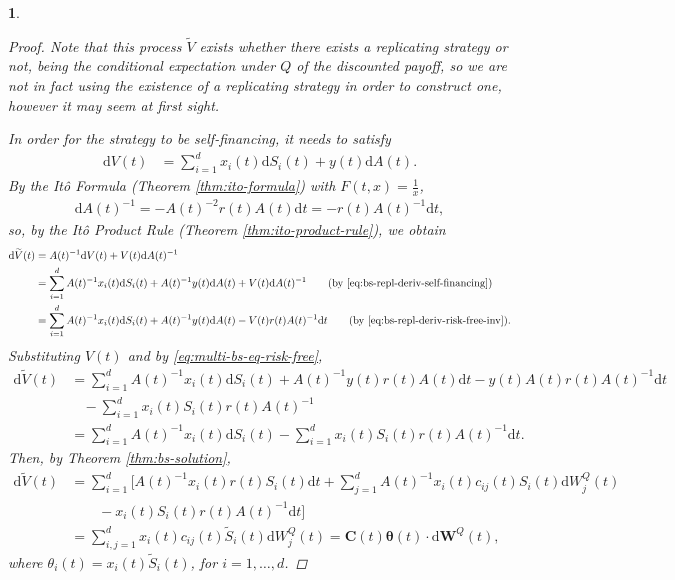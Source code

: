 \documentclass[english]{article}
\numberwithin{equation}{section}
\numberwithin{figure}{section}
\theoremstyle{bolddescit}
\newtheorem{theorem}{\protect\theoremname}[section]
\theoremstyle{definition}
\theoremstyle{definition}
\theoremstyle{plain}
\theoremstyle{plain}
\theoremstyle{bolddesc}
\theoremstyle{plain}
\theoremstyle{remark}
\providecommand{\theoremname}{Theorem}
\begin{document}
\begin{theorem}
\begin{proof}
    Note that this process $\widetilde{V}$ exists whether there exists a replicating strategy or not, being the conditional expectation under $Q$ of the discounted payoff, so we are not in fact using the existence of a replicating strategy in order to construct one, however it may seem at first sight.

    In order for the strategy to be self-financing, it needs to satisfy
    \begin{align}\label{eq:bs-repl-deriv-self-financing}
      \mathrm{d}V(t) &= \sum_{i=1}^d x_i(t) \mathrm{d}S_i(t) + y(t) \mathrm{d}A(t).
    \end{align}
    By the It\^o Formula (Theorem \ref{thm:ito-formula}) with $F(t,x) = \frac{1}{x}$,
    \begin{align}\label{eq:bs-repl-deriv-risk-free-inv}
      \mathrm{d}A(t)^{-1} = -A(t)^{-2} r(t) A(t) \mathrm{d}t = - r(t) A(t)^{-1} \mathrm{d}t,
    \end{align}
    so, by the It\^o Product Rule (Theorem \ref{thm:ito-product-rule}), we obtain
    \begin{align*}
      \mathrm{d}\widetilde{V}(t)
      &= A(t)^{-1} \mathrm{d}V(t) + V(t) \mathrm{d}A(t)^{-1}\\
      &= \sum_{i=1}^d A(t)^{-1} x_i(t) \mathrm{d}S_i(t) + A(t)^{-1} y(t) \mathrm{d}A(t) + V(t) \mathrm{d}A(t)^{-1}\tag{by \eqref{eq:bs-repl-deriv-self-financing}}\\
      &= \sum_{i=1}^d A(t)^{-1} x_i(t) \mathrm{d}S_i(t) + A(t)^{-1} y(t) \mathrm{d}A(t) - V(t) r(t) A(t)^{-1} \mathrm{d}t \tag{by \eqref{eq:bs-repl-deriv-risk-free-inv}}.
    \end{align*}
    Substituting $V(t)$ and by \eqref{eq:multi-bs-eq-risk-free},
    \begin{align*}
      \mathrm{d}\widetilde{V}(t)
      &= \sum_{i=1}^d A(t)^{-1} x_i(t) \mathrm{d}S_i(t) + A(t)^{-1} y(t) r(t) A(t) \mathrm{d}t - y(t) A(t) r(t) A(t)^{-1} \mathrm{d}t\\
        &\ \ \ \ - \sum_{i=1}^d x_i(t) S_i(t) r(t) A(t)^{-1}\\
      &= \sum_{i=1}^d A(t)^{-1} x_i(t) \mathrm{d}S_i(t) - \sum_{i=1}^d x_i(t) S_i(t) r(t) A(t)^{-1} \mathrm{d}t.
    \end{align*}
    Then, by Theorem \ref{thm:bs-solution},
    \begin{align*}
      \mathrm{d}\widetilde{V}(t)
      &= \sum_{i=1}^d [ A(t)^{-1} x_i(t) r(t) S_i(t) \mathrm{d}t + \sum_{j=1}^d A(t)^{-1} x_i(t) c_{ij}(t) S_i(t) \mathrm{d}W^Q_j(t) \\
        &\ \ \ \ \ \ \ \ \ - x_i(t) S_i(t) r(t) A(t)^{-1} \mathrm{d}t ]\\
      &= \sum_{i,j=1}^d x_i(t) c_{ij}(t) \widetilde{S}_i(t) \mathrm{d}W^Q_j(t)
      = \mathbf{C}(t) \mathbf{\theta}(t) \cdot \mathrm{d}\mathbf{W}^Q(t),
    \end{align*}
    where $\theta_i(t) = x_i(t) \widetilde{S}_i(t)$, for $i=1,\ldots,d$.


\end{proof}
\end{theorem}
\end{document}
